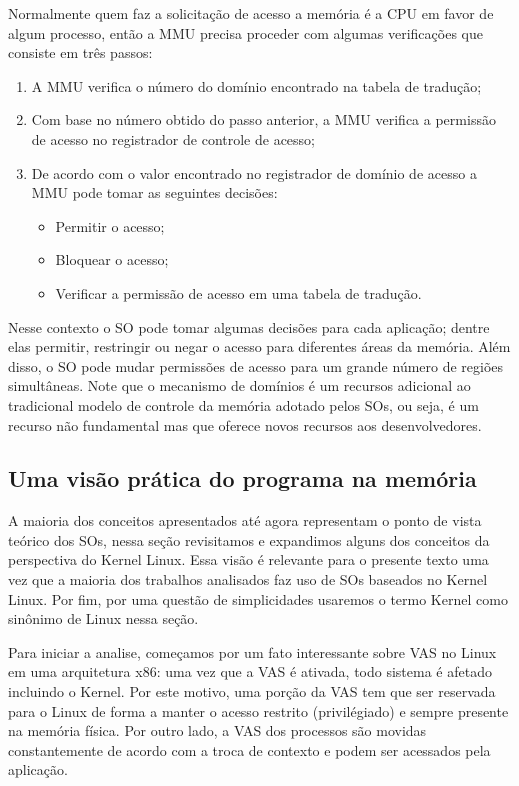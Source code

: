 Normalmente quem faz a solicitação de acesso a memória é a CPU em favor de
algum processo, então a MMU precisa proceder com algumas verificações que
consiste em três passos:

\begin{enumerate}
  \item A MMU verifica o número do domínio encontrado na tabela de tradução;
  \item Com base no número obtido do passo anterior, a MMU verifica a permissão
        de acesso no registrador de controle de acesso;
  \item De acordo com o valor encontrado no registrador de domínio de acesso a
        MMU pode tomar as seguintes decisões:
  \begin{itemize}
    \item Permitir o acesso;
    \item Bloquear o acesso;
    \item Verificar a permissão de acesso em uma tabela de tradução.
  \end{itemize}
\end{enumerate}

Nesse contexto o SO pode tomar algumas decisões para cada aplicação; dentre
elas permitir, restringir ou negar o acesso para diferentes áreas da memória.
Além disso, o SO pode mudar permissões de acesso para um grande número de
regiões simultâneas. Note que o mecanismo de domínios é um recursos adicional
ao tradicional modelo de controle da memória adotado pelos SOs, ou seja, é
um recurso não fundamental mas que oferece novos recursos aos desenvolvedores.

\subsection{Uma visão prática do programa na memória}
\label{sec:visao_pratica_mem}

A maioria dos conceitos apresentados até agora representam o ponto de vista
teórico dos SOs, nessa seção revisitamos e expandimos alguns dos conceitos da
perspectiva do Kernel Linux. Essa visão é relevante para o presente texto uma
vez que a maioria dos trabalhos analisados faz uso de SOs baseados no Kernel
Linux. Por fim, por uma questão de simplicidades usaremos o termo Kernel como
sinônimo de Linux nessa seção.

Para iniciar a analise, começamos por um fato interessante sobre VAS no Linux
em uma arquitetura x86: uma vez que a VAS é ativada, todo sistema é afetado
incluindo o Kernel. Por este motivo, uma porção da VAS tem que ser reservada
para o Linux de forma a manter o acesso restrito (privilégiado) e sempre
presente na memória física. Por outro lado, a VAS dos processos são movidas
constantemente de acordo com a troca de contexto e podem ser acessados pela
aplicação.

